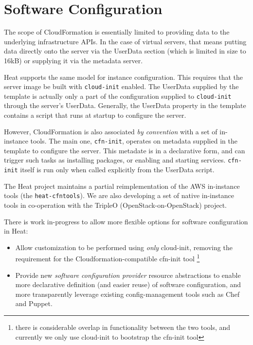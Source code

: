 \section{Software Configuration}

The scope of CloudFormation is essentially limited to providing data to the underlying infrastructure APIs. In the case of virtual servers, that means putting data directly onto the server via the UserData section (which is limited in size to 16kB) or supplying it via the metadata server.

Heat supports the same model for instance configuration.  This requires that the server image be built with \texttt{cloud-init} enabled. The UserData supplied by the template is actually only a part of the configuration supplied to \texttt{cloud-init} through the server's UserData. Generally, the UserData property in the template contains a script that runs at startup to configure the server.

However, CloudFormation is also associated \emph{by convention} with a set of in-instance tools. The main one, \texttt{cfn-init}, operates on metadata supplied in the template to configure the server. This metadate is in a declarative form, and can trigger such tasks as installing packages, or enabling and starting services. \texttt{cfn-init} itself is run only when called explicitly from the UserData script.

The Heat project maintains a partial reimplementation of the AWS in-instance tools (the \texttt{heat-cfntools}). We are also developing a set of native in-instance tools in co-operation with the TripleO (OpenStack-on-OpenStack) project.

There is work in-progress to allow more flexible options for software configuration in Heat:

\begin{itemize}
\item Allow customization to be performed using \emph{only} cloud-init, removing the requirement for the Cloudformation-compatible cfn-init tool \footnote{there is considerable overlap in functionality between the two tools, and currently we only use cloud-init to bootstrap the cfn-init tool}
\item Provide new \emph{software configuration provider} resource abstractions to enable more declarative definition (and easier reuse) of software configuration, and more transparently leverage existing config-management tools such as Chef and Puppet.
\end{itemize}
